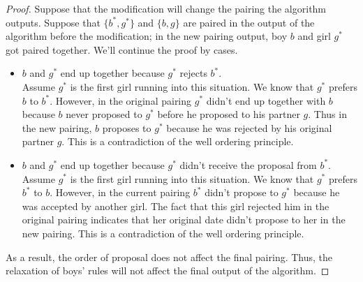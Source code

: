 \documentclass[11pt]{article}
\begin{document}
\begin{Parts}
        \begin{Answer}
            \begin{proof}
                Suppose that the modification will change the pairing the algorithm outputs. Suppose that $\{b^*, g^*\}$ and $\{b, g\}$ 
                are paired in the output of the algorithm before the modification; in the new pairing output, boy $b$ and girl $g^*$ got 
                paired together. We'll continue the proof by cases.
                \begin{itemize}
                    \item $b$ and $g^*$ end up together because $g^*$ rejects $b^*$. \\
                          Assume $g^*$ is the first girl running into this situation. We know that $g^*$ prefers $b$ to $b^*$. However, in
                          the original pairing $g^*$ didn't end up together with $b$ because $b$ never proposed to $g^*$ before he proposed 
                          to his partner $g$. Thus in the new pairing, $b$ proposes to $g^*$ because he was rejected by his original partner
                          $g$. This is a contradiction of the well ordering principle. 
                    \item $b$ and $g^*$ end up together because $g^*$ didn't receive the proposal from $b^*$. \\
                          Assume $g^*$ is the first girl running into this situation. We know that $g^*$ prefers $b^*$ to $b$. However, in 
                          the current pairing $b^*$ didn't propose to $g^*$ because he was accepted by another girl. The fact that this girl
                          rejected him in the original pairing indicates that her original date didn't propose to her in the new pairing. This
                          is a contradiction of the well ordering principle.  
                \end{itemize}
                As a result, the order of proposal does not affect the final pairing. Thus, the relaxation of boys' rules will not affect 
                the final output of the algorithm.
            \end{proof}
        \end{Answer}

    \end{Parts}

    \newpage
\end{document}
